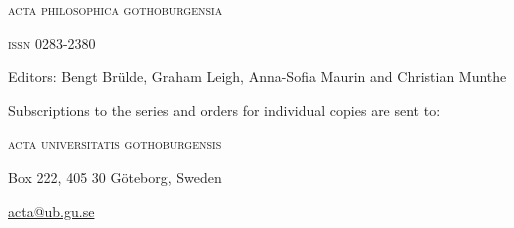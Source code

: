 \documentclass[fontsize=14pt,
               paper=297mm:210mm,
               twoside,
               pagesize=pdftex,
               DIV=calc
]{scrbook}
\begin{document}
\fontsize{12}{15}\selectfont
\thispagestyle{empty}


\pagestyle{empty}


\begin{center}
\textsc{acta philosophica gothoburgensia}

\textsc{issn 0283-2380}

\vspace{\baselineskip}
 Editors: Bengt Br\"ulde, Graham Leigh, Anna-Sofia Maurin and Christian Munthe
\vspace{\baselineskip}

Subscriptions to the series and orders for individual copies are sent to:

\textsc{acta universitatis gothoburgensis}

Box 222, 405 30 G\"oteborg, Sweden

\url{acta@ub.gu.se}
\end{center}
\raggedcolumns
\end{document}
